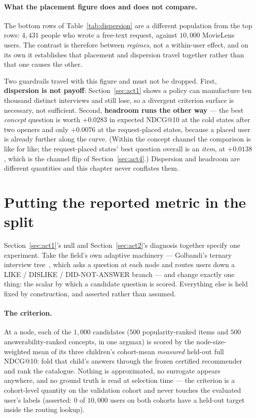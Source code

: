 \documentclass[11pt]{article}
\begin{document}
\paragraph{What the placement figure does and does not compare.} The bottom rows of
Table~\ref{tab:dispersion} are a different population from the top rows: $4{,}431$ people who wrote
a free-text request, against $10{,}000$ MovieLens users. The contrast is therefore between
\emph{regimes}, not a within-user effect, and on its own it establishes that placement and
dispersion travel together rather than that one causes the other.

Two guardrails travel with this figure and must not be dropped. First, \textbf{dispersion is not
payoff}: Section~\ref{sec:act1} shows a policy can manufacture ten thousand distinct interviews and
still lose, so a divergent criterion surface is necessary, not sufficient. Second, \textbf{headroom
runs the other way} --- the best \emph{concept} question is worth $+0.0283$ in expected NDCG@10 at
the cold states after two openers and only $+0.0076$ at the request-placed states, because a placed
user is already further along the curve. (Within the concept channel the comparison is like for
like; the request-placed states' best question overall is an \emph{item}, at $+0.0138$, which is
the channel flip of Section~\ref{sec:act4}.) Dispersion and headroom are different quantities and
this chapter never conflates them.

\section{Putting the reported metric in the split}
\label{sec:act3}

Section~\ref{sec:act1}'s null and Section~\ref{sec:act2}'s diagnosis together specify one experiment. Take the field's own adaptive
machinery --- Golbandi's ternary interview tree~\cite{golbandi2011adaptive}, which asks a question at
each node and routes users down a LIKE / DISLIKE / DID-NOT-ANSWER branch --- and change exactly one
thing: the scalar by which a candidate question is scored. Everything else is held fixed by
construction, and asserted rather than assumed.

\paragraph{The criterion.} At a node, each of the $1{,}000$ candidates ($500$ popularity-ranked items
and $500$ answerability-ranked concepts, in one argmax) is scored by the node-size-weighted mean of
its three children's cohort-mean \emph{measured} held-out full NDCG@10: fold that child's answers
through the frozen certified recommender and rank the catalogue. Nothing is approximated, no
surrogate appears anywhere, and no ground truth is read at selection time --- the criterion is a
cohort-level quantity on the validation cohort and never touches the evaluated user's labels
(asserted: $0$ of $10{,}000$ users on both cohorts have a held-out target inside the routing lookup).
\end{document}
